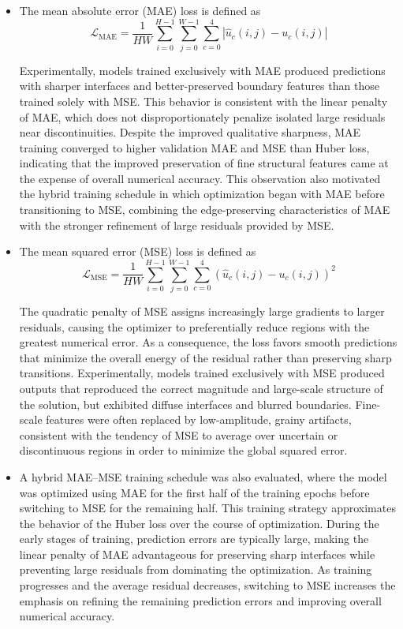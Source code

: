 \documentclass[preprint,review,12pt,numafflabel]{elsarticle}
\begin{document}
\begin{itemize}
    \item The mean absolute error (MAE) loss is defined as
\begin{equation*}
    \mathcal{L}_{\text{MAE}} = \frac{1}{HW} \sum_{i=0}^{H-1} \sum_{j=0}^{W-1} \sum_{c=0}^{4} \left| \hat{u}_{c}(i,j) - u_{c}(i,j) \right|
\end{equation*}

Experimentally, models trained exclusively with MAE produced predictions with sharper interfaces and better-preserved boundary features than those trained solely with MSE. This behavior is consistent with the linear penalty of MAE, which does not disproportionately penalize isolated large residuals near discontinuities. Despite the improved qualitative sharpness, MAE training converged to higher validation MAE and MSE than Huber loss, indicating that the improved preservation of fine structural features came at the expense of overall numerical accuracy. This observation also motivated the hybrid training schedule in which optimization began with MAE before transitioning to MSE, combining the edge-preserving characteristics of MAE with the stronger refinement of large residuals provided by MSE.

\item The mean squared error (MSE) loss is defined as
\begin{equation*}
    \mathcal{L}_{\text{MSE}} = \frac{1}{HW} \sum_{i=0}^{H-1} \sum_{j=0}^{W-1} \sum_{c=0}^{4} \left( \hat{u}_{c}(i,j) - u_{c}(i,j) \right)^2
\end{equation*}

The quadratic penalty of MSE assigns increasingly large gradients to larger residuals, causing the optimizer to preferentially reduce regions with the greatest numerical error. As a consequence, the loss favors smooth predictions that minimize the overall energy of the residual rather than preserving sharp transitions. Experimentally, models trained exclusively with MSE produced outputs that reproduced the correct magnitude and large-scale structure of the solution, but exhibited diffuse interfaces and blurred boundaries. Fine-scale features were often replaced by low-amplitude, grainy artifacts, consistent with the tendency of MSE to average over uncertain or discontinuous regions in order to minimize the global squared error.

\item A hybrid MAE--MSE training schedule was also evaluated, where the model was optimized using MAE for the first half of the training epochs before switching to MSE for the remaining half. This training strategy approximates the behavior of the Huber loss over the course of optimization. During the early stages of training, prediction errors are typically large, making the linear penalty of MAE advantageous for preserving sharp interfaces while preventing large residuals from dominating the optimization. As training progresses and the average residual decreases, switching to MSE increases the emphasis on refining the remaining prediction errors and improving overall numerical accuracy.


\end{itemize}
\end{document}
